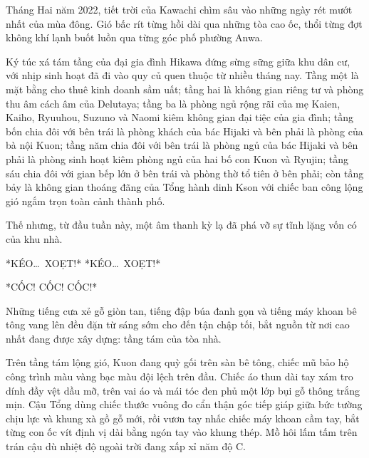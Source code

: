 ﻿\documentclass[../main.tex]{subfiles}
\begin{document}

Tháng Hai năm 2022, tiết trời của Kawachi chìm sâu vào những ngày rét mướt nhất của mùa đông. Gió bấc rít từng hồi dài qua những tòa cao ốc, thổi từng đợt không khí lạnh buốt luồn qua từng góc phố phường Anwa.

Ký túc xá tám tầng của đại gia đình Hikawa đứng sừng sững giữa khu dân cư, với nhịp sinh hoạt đã đi vào quy củ quen thuộc từ nhiều tháng nay. Tầng một là mặt bằng cho thuê kinh doanh sầm uất; tầng hai là không gian riêng tư và phòng thu âm cách âm của Delutaya; tầng ba là phòng ngủ rộng rãi của mẹ Kaien, Kaiho, Ryuuhou, Suzuno và Naomi kiêm không gian đại tiệc của gia đình; tầng bốn chia đôi với bên trái là phòng khách của bác Hijaki và bên phải là phòng của bà nội Kuon; tầng năm chia đôi với bên trái là phòng ngủ của bác Hijaki và bên phải là phòng sinh hoạt kiêm phòng ngủ của hai bố con Kuon và Ryujin; tầng sáu chia đôi với gian bếp lớn ở bên trái và phòng thờ tổ tiên ở bên phải; còn tầng bảy là không gian thoáng đãng của Tổng hành dinh Kson với chiếc ban công lộng gió ngắm trọn toàn cảnh thành phố.

Thế nhưng, từ đầu tuần này, một âm thanh kỳ lạ đã phá vỡ sự tĩnh lặng vốn có của khu nhà.

*KÉO\dots\ XOẸT!* *KÉO\dots\ XOẸT!*

*CỐC! CỐC! CỐC!*

Những tiếng cưa xẻ gỗ giòn tan, tiếng đập búa đanh gọn và tiếng máy khoan bê tông vang lên đều đặn từ sáng sớm cho đến tận chập tối, bắt nguồn từ nơi cao nhất đang được xây dựng: tầng tám của tòa nhà.

Trên tầng tám lộng gió, Kuon đang quỳ gối trên sàn bê tông, chiếc mũ bảo hộ công trình màu vàng bạc màu đội lệch trên đầu. Chiếc áo thun dài tay xám tro dính đầy vệt dầu mỡ, trên vai áo và mái tóc đen phủ một lớp bụi gỗ thông trắng mịn. Cậu Tổng dùng chiếc thước vuông đo cẩn thận góc tiếp giáp giữa bức tường chịu lực và khung xà gồ gỗ mới, rồi vươn tay nhấc chiếc máy khoan cầm tay, bắt từng con ốc vít định vị dài bằng ngón tay vào khung thép. Mồ hôi lấm tấm trên trán cậu dù nhiệt độ ngoài trời đang xấp xỉ năm độ C.
\end{document}
